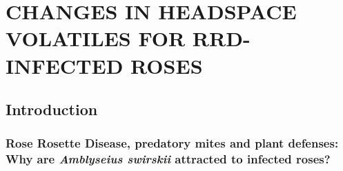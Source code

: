 \documentclass[12pt,final,CPage]{ufthesis}
\begin{document}
{  \hypertarget{chemeco}{%
  \chapter{CHANGES IN HEADSPACE VOLATILES FOR RRD-INFECTED ROSES}\label{chemeco}}

  \hypertarget{intro-swirskii-vocs}{%
  \section{Introduction}\label{intro-swirskii-vocs}}

  \hypertarget{intro-swirskii}{%
  \subsection{\texorpdfstring{Rose Rosette Disease, predatory mites and plant defenses: Why are \emph{Amblyseius swirskii} attracted to infected roses?}{Rose Rosette Disease, predatory mites and plant defenses: Why are Amblyseius swirskii attracted to infected roses?}}\label{intro-swirskii}}

}
\end{document}
